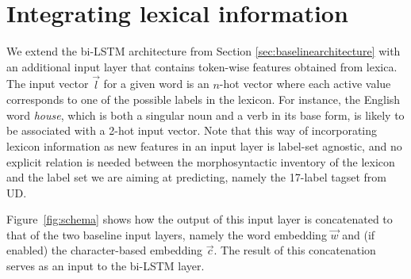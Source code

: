 \documentclass[11pt,letterpaper]{article}
\begin{document}
\section{Integrating lexical information}

We extend the bi-LSTM architecture from Section \ref{sec:baselinearchitecture} with an additional input layer that
contains token-wise features obtained from lexica. The input vector $\vec{l}$ for a given word is an $n$-hot vector
where each active value corresponds to one of the possible labels in the lexicon. For instance, the English word
\textit{house}, which is both a singular noun and a verb in its base form, is likely to be associated with a 2-hot input
vector.  Note that this way of incorporating lexicon information as new features in an input layer is label-set
agnostic, and no explicit relation is needed between the morphosyntactic inventory of the lexicon and the label set we
are aiming at predicting, namely the 17-label tagset from UD.

Figure~\ref{fig:schema} shows how the output of this input layer is concatenated to that of the two baseline input
layers, namely the word embedding $\vec{w}$ and (if enabled) the character-based embedding $\vec{c}$. The result of this
concatenation serves as an input to the bi-LSTM layer.
\end{document}
